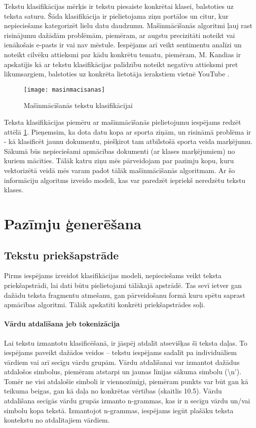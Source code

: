 Tekstu klasifikācijas mērķis ir tekstu piesaiste konkrētai klasei, balstoties uz teksta saturu. Šāda klasifikācija ir pielietojama ziņu portālos un citur, kur nepieciešams kategorizēt lielu datu daudzumu. Mašīnmācīšanās algoritmi ļauj rast risinājumu dažādām problēmām, piemēram, ar augstu precizitāti noteikt vai ienākošais e-pasts ir vai nav mēstule. Iespējams arī veikt sentimentu analīzi un noteikt cilvēku attieksmi par kādu konkrētu tematu, piemēram, M. Kandias ir apskatījis kā ar tekstu klasifikācijas palīdzību noteikt negatīvu attieksmi pret likumsargiem, balstoties uz konkrēta lietotāja ierakstiem vietnē YouTube \cite{threatdetectionyoutube}.

\begin{figure}[H]
	\texttt{[image: masinmacisanas]}
	\caption{Mašīnmācīšanās tekstu klasifikācijai}
	\label{fig:masinmacisanas}
\end{figure}

Teksta klasifikācijas piemēru ar mašīnmācīšanās pielietojumu iespējams redzēt attēlā  \ref{fig:masinmacisanas}. Pieņemsim, ka dota datu kopa ar sporta ziņām, un risināmā problēma ir - kā klasificēt jaunu dokumentu, piešķirot tam atbilstošā sporta veida marķējumu. Sākumā būs nepieciešami apmācības dokumenti (ar klases marķējumiem) no kuriem mācīties. Tālāk katru ziņu mēs pārveidojam par pazīmju kopu, kuru vektorizētā veidā mēs varam padot tālāk mašīnmācīšanās algoritmam. Ar šo informāciju algoritms izveido modeli, kas var paredzēt iepriekš neredzētu tekstu klases.

\chapter{Pazīmju ģenerēšana}
\section{Tekstu priekšapstrāde}
Pirms iespējams izveidot klasifikācijas modeli, nepieciešams veikt teksta priekšapstrādi, lai dati būtu pielietojami tālākajā apstrādē. Tas sevī ietver gan dažādu teksta fragmentu atmešanu, gan pārveidošanu formā kuru spētu saprast apmācības algoritmi. Tālāk apskatīti konkrēti priekšapstrādes soļi.

\subsubsection{Vārdu atdalīšana jeb tokenizācija}
Lai tekstu izmantotu klasificēšanā, ir jāspēj atdalīt atsevišķas šī teksta daļas. To iespējams paveikt dažādos veidos – tekstu iespējams sadalīt pa individuāliem vārdiem vai arī  secīgu vārdu grupām. Vārdu atdalīšanai var izmantot dažādus atdalošos simbolus, piemēram atstarpi un jaunas līnijas sākuma simbolu (\textbackslash n’). Tomēr ne visi atdalošie simboli ir viennozīmīgi, piemēram punkts var būt gan kā teikuma beigas, gan kā daļa no konkrētas vērtības (skaitlis 10.5).
Vārdu atdalīšana secīgās vārdu grupās izmanto n-grammas, kas ir n secīgu vārdu un/vai simbolu kopa tekstā. Izmantojot n-grammas, iespējams iegūt plašāku teksta kontekstu no atdalītajiem vārdiem.

